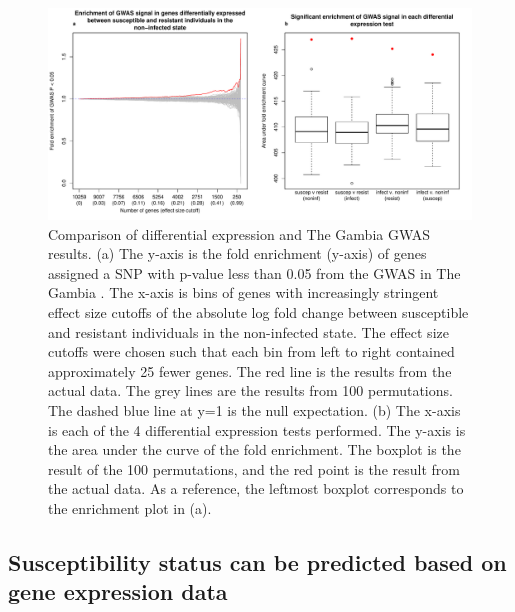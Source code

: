\documentclass[fleqn,10pt]{wlscirep}
\begin{document}
\begin{figure}[ht]
\centering
\includegraphics[width=\linewidth]{../figure/gwas.pdf}
\caption{
Comparison of differential expression and The Gambia GWAS results. (a)
The y-axis is the fold enrichment (y-axis) of genes assigned a SNP
with p-value less than 0.05 from the GWAS in The Gambia
\cite{Thye2010}. The x-axis is bins of genes with increasingly
stringent effect size cutoffs of the absolute log fold change between
susceptible and resistant individuals in the non-infected state. The
effect size cutoffs were chosen such that each bin from left to right
contained approximately 25 fewer genes. The red line is the results
from the actual data. The grey lines are the results from 100
permutations. The dashed blue line at y=1 is the null expectation. (b)
The x-axis is each of the 4 differential expression tests performed.
The y-axis is the area under the curve of the fold enrichment. The
boxplot is the result of the 100 permutations, and the red point is
the result from the actual data. As a reference, the leftmost boxplot
corresponds to the enrichment plot in (a).
}
\label{fig:gwas}
\end{figure}

\subsection*{Susceptibility status can be predicted based on gene expression data}
\end{document}
